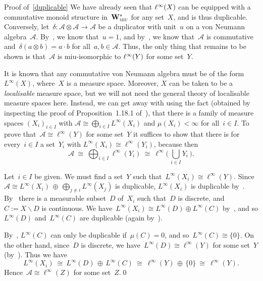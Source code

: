 \documentclass[a]{subfiles}
\begin{document}
\begin{parsec}%
\begin{point}{Proof of~\ref{duplicable}}%
We have already seen that $\ell^\infty(X)$
can be  equipped with a commutative monoid
structure in~$\mathbf{W}^*_{\text{\textsc{miu}}}$
for any set~$X$,
and is thus duplicable.
Conversely,
let~$\delta\colon \mathscr{A}\otimes\mathscr{A}\to\mathscr{A}$
be a duplicator with unit~$u$ on a von Neumann algebra~$\mathscr{A}$.
By~, we know that~$u=1$,
and by~,
we know that~$\mathscr{A}$
is commutative 
and~$\delta(a\otimes b)=a\cdot b$
for all~$a,b\in \mathscr{A}$.
Thus, the only thing that remains to be shown
is that~$\mathscr{A}$ is miu-isomorphic to $\ell^\infty(Y)$
for some set~$Y$.

It is known that 
any commutative von Neumann algebra must be of the form $L^\infty(X)$,
where~$X$ is a  measure space.
Moreover, $X$ can be taken to be a \emph{localisable} measure space,
but we will not need the general theory of localisable measure spaces here.
Instead,
we can get away with using the fact
(obtained 
by inspecting the proof of Proposition~1.18.1
of~\cite{sakai}),
that there is a family of measure spaces $(X_i)_{i\in I}$
with $\mathscr{A}\cong \bigoplus_{i\in I} L^\infty(X_i)$
and $\mu(X_i)<\infty$ for all~$i\in I$.
To prove that~$\mathscr{A}\cong \ell^\infty(Y)$
for some set~$Y$ it suffices
to show that there is for every~$i\in I$
 a set~$Y_i$
with $L^\infty(X_i)\cong \ell^\infty(Y_i)$,
because then 
\begin{equation*}
\textstyle \mathscr{A}\ \cong \ 
\bigoplus_{i\in I} \ell^\infty(Y_i)\ \cong\ 
\ell^\infty\bigl(\,\bigcup_{i\in I} Y_i\,\bigr).
\end{equation*}

Let~$i\in I$ be given.
We must find a set~$Y$ 
such that~$L^\infty(X_i)\cong \ell^\infty(Y)$.
Since~$\mathscr{A}\cong L^\infty(X_i)\,\oplus\,\bigoplus_{j\neq i} 
L^\infty(X_j)$ is duplicable,
$L^\infty(X_i)$ is duplicable
by~.
By~
there is a measurable subset~$D$ of~$X_i$ such that~$D$
is discrete, and $C:=X\backslash D$ is continuous.
We have~$L^\infty(X_i)\cong L^\infty(D)\oplus L^\infty(C)$
by~\sref{lem:measure-space-partition},
and
so $L^\infty(D)$ and~$L^\infty(C)$
are duplicable
(again by~).

By~,
$L^\infty(C)$
can only be duplicable if~$\mu(C)=0$,
and so~$L^\infty(C)\cong \{0\}$.
On the other hand,
since~$D$ is discrete,
we have~$L^\infty(D)\cong \ell^\infty(Y)$
for some set~$Y$
(by~).
Thus we have
\begin{equation*}
L^\infty(X_i)
\ \cong\  L^\infty(D)\,\oplus\, L^\infty(C)
\ \cong\  \ell^\infty(Y)\,\oplus\, \{0\}
\ \cong\  \ell^\infty(Y).
\end{equation*}
Hence~$\mathscr{A}\cong \ell^\infty(Z)$
for some set~$Z$.\qed
\end{point}
\end{parsec}
\end{document}
